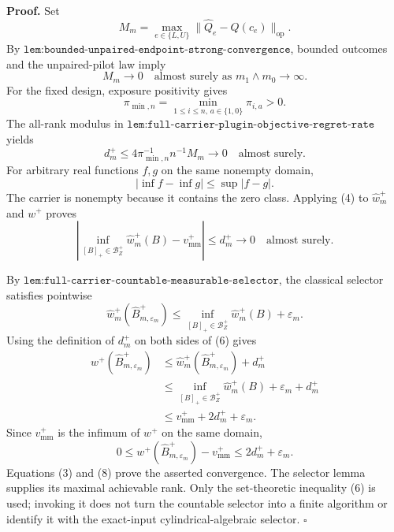 \textbf{Proof.}
Set
\[
M_m=\max_{e\in\{L,U\}}
\lVert\widehat Q_e-Q(c_e)\rVert_{\mathrm{op}}.
\]
By \(\texttt{lem:bounded-unpaired-endpoint-strong-convergence}\), bounded outcomes and the unpaired-pilot law imply
\[
M_m\longrightarrow0
\quad\text{almost surely as }m_1\wedge m_0\to\infty.
\tag{1}
\]
For the fixed design, exposure positivity gives
\[
\pi_{\min,n}=\min_{1\le i\le n,\,a\in\{1,0\}}\pi_{i,a}>0.
\tag{2}
\]
The all-rank modulus in \(\texttt{lem:full-carrier-plugin-objective-regret-rate}\) yields
\[
d_m^+
\le4\pi_{\min,n}^{-1}n^{-1}M_m
\longrightarrow0
\quad\text{almost surely}.
\tag{3}
\]
For arbitrary real functions \(f,g\) on the same nonempty domain,
\[
|\inf f-\inf g|\le\sup|f-g|.
\tag{4}
\]
The carrier is nonempty because it contains the zero class.  Applying (4) to \(\widehat w_m^+\) and \(w^+\) proves
\[
\left|
\inf_{[B]_+\in\mathcal B_Z^+}\widehat w_m^+(B)
-v_{\mathrm{mm}}^+
\right|
\le d_m^+\longrightarrow0
\quad\text{almost surely}.
\tag{5}
\]

By \(\texttt{lem:full-carrier-countable-measurable-selector}\), the classical selector satisfies pointwise
\[
\widehat w_m^+(\widehat B_{m,\varepsilon_m}^+)
\le
\inf_{[B]_+\in\mathcal B_Z^+}\widehat w_m^+(B)+\varepsilon_m.
\tag{6}
\]
Using the definition of \(d_m^+\) on both sides of (6) gives
\[
\begin{aligned}
w^+(\widehat B_{m,\varepsilon_m}^+)
&\le\widehat w_m^+(\widehat B_{m,\varepsilon_m}^+)+d_m^+\\
&\le\inf_{[B]_+\in\mathcal B_Z^+}\widehat w_m^+(B)
+\varepsilon_m+d_m^+\\
&\le v_{\mathrm{mm}}^++2d_m^++\varepsilon_m.
\end{aligned}
\tag{7}
\]
Since \(v_{\mathrm{mm}}^+\) is the infimum of \(w^+\) on the same domain,
\[
0\le w^+(\widehat B_{m,\varepsilon_m}^+)-v_{\mathrm{mm}}^+
\le2d_m^++\varepsilon_m.
\tag{8}
\]
Equations (3) and (8) prove the asserted convergence.  The selector lemma supplies its maximal achievable rank.  Only the set-theoretic inequality (6) is used; invoking it does not turn the countable selector into a finite algorithm or identify it with the exact-input cylindrical-algebraic selector. \(\square\)